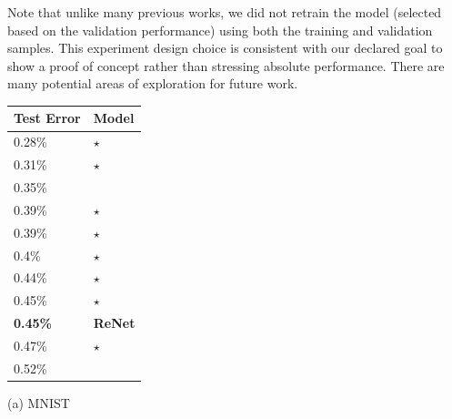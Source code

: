 Note that unlike many previous works, we did not retrain the model (selected
based on the validation performance) using both the training and validation
samples. This experiment design choice is consistent with our declared goal to
show a proof of concept rather than stressing absolute performance. There are
many potential areas of exploration for future work.

\begin{table}[ht]
    \centering

    \begin{minipage}{0.45\textwidth}
        \centering

        \begin{tabular}{l |  l}
            Test Error & Model  \\
            \hline
0.28\% & \citep{DBLP:conf/icml/WanZZLF13}$\star$ \\
0.31\% & \citep{DBLP:journals/corr/Graham14}$\star$ \\
0.35\% & \citep{DBLP:journals/corr/abs-1003-0358} \\
0.39\% & \citep{DBLP:conf/nips/MairalKHS14}$\star$ \\
0.39\% & \citep{DBLP:journals/corr/LeeXGZT14}$\star$ \\
0.4\% & \citep{DBLP:conf/icdar/SimardSP03}$\star$ \\
0.44\% & \citep{DBLP:journals/corr/Graham14a}$\star$ \\
0.45\% & \citep{Goodfellow2013}$\star$ \\
\bf{0.45\%} & \bf{ReNet} \\
0.47\% & \citep{Lin2014}$\star$ \\
0.52\% & \citep{DBLP:journals/pami/AzzopardiA13} \\
        \end{tabular}

        \vspace{2mm}
        (a) MNIST
    \end{minipage}
    \hfill
    \begin{minipage}{0.45\textwidth}
        \centering


\end{minipage}
\end{table}
